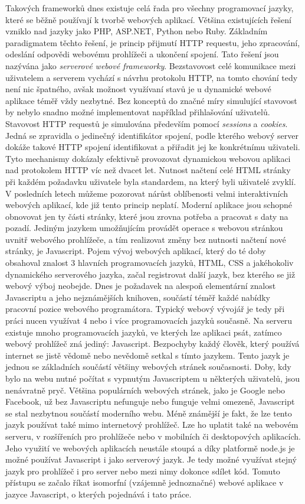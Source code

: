 Takových frameworků dnes existuje celá řada pro všechny programovací jazyky, které se běžně používají k tvorbě webových aplikací. Většina existujících řešení vzniklo nad jazyky jako PHP, ASP.NET, Python nebo Ruby. Základním paradigmatem těchto řešení, je princip přijmutí HTTP requestu, jeho zpracování, odeslání odpovědi webovému prohlížeči a ukončení spojení. Tato řešení jsou nazývána jako \textit{serverové webové frameworky}. Bezstavovost celé komunikace mezi uživatelem a serverem vychází s návrhu protokolu HTTP, na tomto chování tedy není nic špatného, avšak možnost využívaní stavů je u dynamické webové aplikace téměř vždy nezbytné. Bez konceptů do značné míry simulující stavovost by nebylo snadno možné implementovat například přihlašování uživatelů. Stavovost HTTP requestů je simulována především pomocí \textit{sessions} a \textit{cookies}. Jedná se zpravidla o jedinečný identifikátor spojení, podle kterého webový server dokáže takové HTTP spojení identifikovat a přiřadit jej ke konkrétnímu uživateli. Tyto mechanismy dokázaly efektivně provozovat dynamickou webovou aplikaci nad protokolem HTTP víc než dvacet let. Nutnost načtení celé HTML stránky při každém požadavku uživatele byla standardem, na který byli uživatelé zvyklí. V posledních letech můžeme pozorovat nárůst oblíbenosti velmi interaktivních webových aplikací, kde již tento princip neplatí. Moderní aplikace jsou schopné obnovovat jen ty části stránky, které jsou zrovna potřeba a pracovat s daty na pozadí. Jediným jazykem umožňujícím provádět operace s webovou stránkou uvnitř webového prohlížeče, a tím realizovat změny bez nutnosti načtení nové stránky, je Javascript. Pojem vývoj webových aplikací, který do té doby obsahoval znalost 3 hlavních programovacích jazyků, HTML, CSS a jakéhokoliv dynamického serverového jazyka, začal registrovat další jazyk, bez kterého se již webový výboj neobejde. Dnes je požadavek na alespoň elementární znalost Javascriptu a jeho nejznámějších knihoven, součástí téměř každé nabídky pracovní pozice webového programátora. Typický webový vývojář je tedy při práci nucen využívat 4 nebo i více programovacích jazyků současně. Na serveru existuje mnoho programovacích jazyků, ve kterých lze aplikaci psát, zatímco webový prohlížeč zná jediný: Javascript. Bezpochyby každý člověk, který používá internet se jistě vědomě nebo nevědomě setkal s tímto jazykem. Tento jazyk je jednou se základních součástí většiny webových stránek současnosti. Doby, kdy bylo na webu nutné počítat s vypnutým Javascriptem u některých uživatelů, jsou nenávratně pryč. Většina populárních webových stránek, jako je Google nebo Facebook, už bez Javascriptu nefunguje nebo funguje velmi omezeně, Javascript se stal nezbytnou součástí moderního webu. Méně známější je fakt, že lze tento jazyk používat také mimo internetový prohlížeč. Lze ho uplatit také na webovém serveru, v rozšířeních pro prohlížeče nebo v mobilních či desktopových aplikacích. Jeho využití ve webových aplikacích neustále stoupá a díky platformě node.js je možné používat Javascript i jako serverový jazyk. Je tedy možné využívat stejný jazyk pro prohlížeč i pro server nebo mezi nimy dokonce sdílet kód. Tomuto přístupu se začalo říkat isomorfní (vzájemně jednoznačné) webové aplikace v jazyce Javascript, o kterých pojednává i tato práce.

